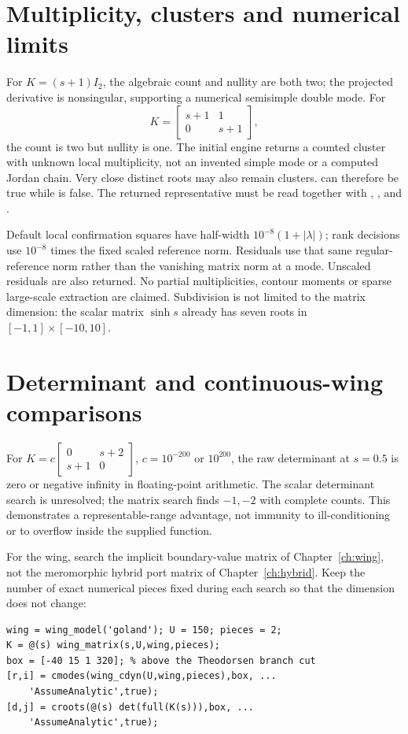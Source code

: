 \section{Multiplicity, clusters and numerical limits}

For $K=(s+1)I_2$, the algebraic count and nullity are both two; the projected
derivative is nonsingular, supporting a numerical semisimple double mode.
For
\begin{equation}
 K=\begin{bmatrix}s+1&1\\0&s+1\end{bmatrix},
\end{equation}
the count is two but nullity is one. The initial engine returns a counted
cluster with unknown local multiplicity, not an invented simple mode or a
computed Jordan chain. Very close distinct roots may also remain clusters.
 can therefore be true while  is false.
The returned representative must be read together with ,
,  and .

Default local confirmation squares have half-width
$10^{-8}(1+|\lambda|)$; rank decisions use $10^{-8}$ times the fixed scaled
reference norm. Residuals use that same regular-reference norm rather than
the vanishing matrix norm at a mode. Unscaled residuals are also returned.
No partial multiplicities, contour moments or sparse large-scale extraction
are claimed. Subdivision is not limited to the matrix dimension: the scalar
matrix $\sinh s$ already has seven roots in $[-1,1]\times[-10,10]$.

\section{Determinant and continuous-wing comparisons}

For $K=c\left[\begin{smallmatrix}0&s+2\\s+1&0\end{smallmatrix}\right]$,
$c=10^{-200}$ or $10^{200}$, the raw determinant at $s=0.5$ is zero or
negative infinity in floating-point arithmetic. The scalar determinant
search is unresolved; the matrix search finds $-1,-2$ with complete counts.
This demonstrates a representable-range advantage, not immunity to
ill-conditioning or to overflow inside the supplied function.

For the wing, search the implicit boundary-value matrix of
Chapter~\ref{ch:wing}, not the meromorphic hybrid port matrix of
Chapter~\ref{ch:hybrid}. Keep the number of exact numerical pieces fixed
during each search so that the dimension does not change:
\begin{lstlisting}
wing = wing_model('goland'); U = 150; pieces = 2;
K = @(s) wing_matrix(s,U,wing,pieces);
box = [-40 15 1 320]; % above the Theodorsen branch cut
[r,i] = cmodes(wing_cdyn(U,wing,pieces),box, ...
    'AssumeAnalytic',true);
[d,j] = croots(@(s) det(full(K(s))),box, ...
    'AssumeAnalytic',true);
\end{lstlisting}

